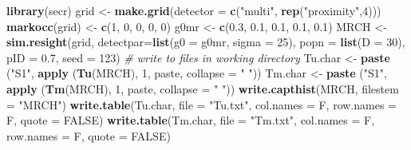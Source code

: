\documentclass[
]{book}
\newenvironment{Shaded}{\begin{snugshade}}{\end{snugshade}}
\newcommand{\AttributeTok}[1]{\textcolor[rgb]{0.13,0.29,0.53}{#1}}
\newcommand{\CommentTok}[1]{\textcolor[rgb]{0.56,0.35,0.01}{\textit{#1}}}
\newcommand{\ConstantTok}[1]{\textcolor[rgb]{0.56,0.35,0.01}{#1}}
\newcommand{\DecValTok}[1]{\textcolor[rgb]{0.00,0.00,0.81}{#1}}
\newcommand{\FloatTok}[1]{\textcolor[rgb]{0.00,0.00,0.81}{#1}}
\newcommand{\FunctionTok}[1]{\textcolor[rgb]{0.13,0.29,0.53}{\textbf{#1}}}
\newcommand{\NormalTok}[1]{#1}
\newcommand{\OtherTok}[1]{\textcolor[rgb]{0.56,0.35,0.01}{#1}}
\newcommand{\StringTok}[1]{\textcolor[rgb]{0.31,0.60,0.02}{#1}}
\begin{document}
\begin{Shaded}
\begin{Highlighting}[]
\FunctionTok{library}\NormalTok{(secr)}
\NormalTok{grid }\OtherTok{\textless{}{-}} \FunctionTok{make.grid}\NormalTok{(}\AttributeTok{detector =} \FunctionTok{c}\NormalTok{(}\StringTok{"multi"}\NormalTok{, }\FunctionTok{rep}\NormalTok{(}\StringTok{"proximity"}\NormalTok{,}\DecValTok{4}\NormalTok{)))}
\FunctionTok{markocc}\NormalTok{(grid) }\OtherTok{\textless{}{-}} \FunctionTok{c}\NormalTok{(}\DecValTok{1}\NormalTok{, }\DecValTok{0}\NormalTok{, }\DecValTok{0}\NormalTok{, }\DecValTok{0}\NormalTok{, }\DecValTok{0}\NormalTok{)}
\NormalTok{g0mr }\OtherTok{\textless{}{-}} \FunctionTok{c}\NormalTok{(}\FloatTok{0.3}\NormalTok{, }\FloatTok{0.1}\NormalTok{, }\FloatTok{0.1}\NormalTok{, }\FloatTok{0.1}\NormalTok{, }\FloatTok{0.1}\NormalTok{)}
\NormalTok{MRCH }\OtherTok{\textless{}{-}} \FunctionTok{sim.resight}\NormalTok{(grid, }\AttributeTok{detectpar=}\FunctionTok{list}\NormalTok{(}\AttributeTok{g0 =}\NormalTok{ g0mr, }\AttributeTok{sigma =} \DecValTok{25}\NormalTok{),  }
                    \AttributeTok{popn =} \FunctionTok{list}\NormalTok{(}\AttributeTok{D =} \DecValTok{30}\NormalTok{), }\AttributeTok{pID =} \FloatTok{0.7}\NormalTok{, }\AttributeTok{seed =} \DecValTok{123}\NormalTok{)}
\CommentTok{\# write to files in working directory}
\NormalTok{Tu.char }\OtherTok{\textless{}{-}} \FunctionTok{paste}\NormalTok{ (}\StringTok{"S1"}\NormalTok{, }\FunctionTok{apply}\NormalTok{ (}\FunctionTok{Tu}\NormalTok{(MRCH), }\DecValTok{1}\NormalTok{, paste, }\AttributeTok{collapse =} \StringTok{" "}\NormalTok{))}
\NormalTok{Tm.char }\OtherTok{\textless{}{-}} \FunctionTok{paste}\NormalTok{ (}\StringTok{"S1"}\NormalTok{, }\FunctionTok{apply}\NormalTok{ (}\FunctionTok{Tm}\NormalTok{(MRCH), }\DecValTok{1}\NormalTok{, paste, }\AttributeTok{collapse =} \StringTok{" "}\NormalTok{))}
\FunctionTok{write.capthist}\NormalTok{(MRCH, }\AttributeTok{filestem =} \StringTok{"MRCH"}\NormalTok{)}
\FunctionTok{write.table}\NormalTok{(Tu.char, }\AttributeTok{file =} \StringTok{"Tu.txt"}\NormalTok{, }\AttributeTok{col.names =}\NormalTok{ F, }\AttributeTok{row.names =}\NormalTok{ F, }\AttributeTok{quote =} \ConstantTok{FALSE}\NormalTok{)}
\FunctionTok{write.table}\NormalTok{(Tm.char, }\AttributeTok{file =} \StringTok{"Tm.txt"}\NormalTok{, }\AttributeTok{col.names =}\NormalTok{ F, }\AttributeTok{row.names =}\NormalTok{ F, }\AttributeTok{quote =} \ConstantTok{FALSE}\NormalTok{)}
\end{Highlighting}
\end{Shaded}
\end{document}
